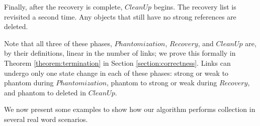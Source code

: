 Finally, after the recovery is complete, $CleanUp$ begins. The recovery list is revisited a second
time. Any objects that still have no strong references are deleted. %

Note that all three of these phases, $Phantomization$, $Recovery$, and $CleanUp$ are,
by their definitions, linear in the number of links; we prove this formally in Theorem \ref{theorem:termination} in Section \ref{section:correctness}. Links can undergo only one
state change in each of these phases: strong or weak to phantom during
$Phantomization$, phantom to strong or weak during $Recovery$, and phantom to
deleted in $CleanUp$. %

We now present some examples to show how our algorithm performs collection in several real word scenarios.

